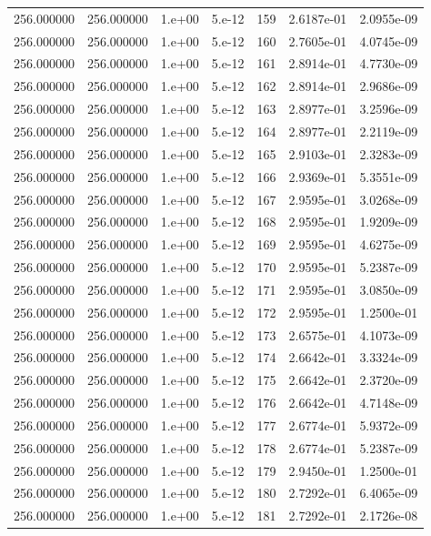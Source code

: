 \begin{table}[htbp]
\begin{tabular}{rrrrrrr}
256.000000 & 256.000000 & 1.e+00 & 5.e-12 & 159 & 2.6187e-01 & 2.0955e-09 \\
256.000000 & 256.000000 & 1.e+00 & 5.e-12 & 160 & 2.7605e-01 & 4.0745e-09 \\
256.000000 & 256.000000 & 1.e+00 & 5.e-12 & 161 & 2.8914e-01 & 4.7730e-09 \\
256.000000 & 256.000000 & 1.e+00 & 5.e-12 & 162 & 2.8914e-01 & 2.9686e-09 \\
256.000000 & 256.000000 & 1.e+00 & 5.e-12 & 163 & 2.8977e-01 & 3.2596e-09 \\
256.000000 & 256.000000 & 1.e+00 & 5.e-12 & 164 & 2.8977e-01 & 2.2119e-09 \\
256.000000 & 256.000000 & 1.e+00 & 5.e-12 & 165 & 2.9103e-01 & 2.3283e-09 \\
256.000000 & 256.000000 & 1.e+00 & 5.e-12 & 166 & 2.9369e-01 & 5.3551e-09 \\
256.000000 & 256.000000 & 1.e+00 & 5.e-12 & 167 & 2.9595e-01 & 3.0268e-09 \\
256.000000 & 256.000000 & 1.e+00 & 5.e-12 & 168 & 2.9595e-01 & 1.9209e-09 \\
256.000000 & 256.000000 & 1.e+00 & 5.e-12 & 169 & 2.9595e-01 & 4.6275e-09 \\
256.000000 & 256.000000 & 1.e+00 & 5.e-12 & 170 & 2.9595e-01 & 5.2387e-09 \\
256.000000 & 256.000000 & 1.e+00 & 5.e-12 & 171 & 2.9595e-01 & 3.0850e-09 \\
256.000000 & 256.000000 & 1.e+00 & 5.e-12 & 172 & 2.9595e-01 & 1.2500e-01 \\
256.000000 & 256.000000 & 1.e+00 & 5.e-12 & 173 & 2.6575e-01 & 4.1073e-09 \\
256.000000 & 256.000000 & 1.e+00 & 5.e-12 & 174 & 2.6642e-01 & 3.3324e-09 \\
256.000000 & 256.000000 & 1.e+00 & 5.e-12 & 175 & 2.6642e-01 & 2.3720e-09 \\
256.000000 & 256.000000 & 1.e+00 & 5.e-12 & 176 & 2.6642e-01 & 4.7148e-09 \\
256.000000 & 256.000000 & 1.e+00 & 5.e-12 & 177 & 2.6774e-01 & 5.9372e-09 \\
256.000000 & 256.000000 & 1.e+00 & 5.e-12 & 178 & 2.6774e-01 & 5.2387e-09 \\
256.000000 & 256.000000 & 1.e+00 & 5.e-12 & 179 & 2.9450e-01 & 1.2500e-01 \\
256.000000 & 256.000000 & 1.e+00 & 5.e-12 & 180 & 2.7292e-01 & 6.4065e-09 \\
256.000000 & 256.000000 & 1.e+00 & 5.e-12 & 181 & 2.7292e-01 & 2.1726e-08 \\

\end{tabular}
\end{table}
